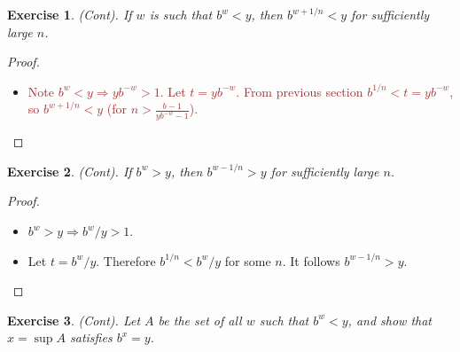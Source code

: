 \documentclass[12pt]{article}
\newtheorem{subexercise}{Exercise}[exercise]
\begin{document}
\begin{subexercise}
    (Cont). If $w$ is such that $b^w < y$, then $b^{w+1/n} < y$ for sufficiently large $n$.
\end{subexercise}

\begin{proof}
    
    \begin{itemize}
        \item \textcolor{brown}{Note $b^w < y \Rightarrow yb^{-w} > 1$. Let $t = y b^{-w}$. From previous section $b^{1/n} < t = y b^{-w}$, so $b^{w+1/n} < y$ (for $n > \frac{b-1}{yb^{-w} -1}$).}
    \end{itemize}
    
\end{proof}

\begin{subexercise}
    (Cont). If $b^w > y$, then $b^{w-1/n} > y$ for sufficiently large $n$.
\end{subexercise}

\begin{proof}
    
    \begin{itemize}
        \item $b^w > y \Rightarrow b^w/y > 1$.
        \item Let $t = b^w/y$. Therefore $b^{1/n} < b^w/y$ for some $n$. It follows $b^{w-1/n} > y$.
    \end{itemize}
    
\end{proof}

\begin{subexercise}
    (Cont). Let $A$ be the set of all $w$ such that $b^w < y$, and show that $x = \sup A$ satisfies $b^x = y$.
\end{subexercise}
\end{document}
